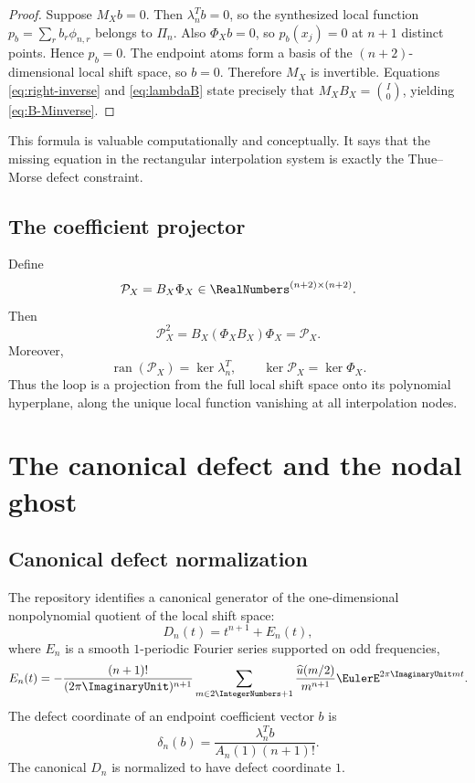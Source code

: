 \documentclass[11pt,oneside]{article}
\theoremstyle{definition}
\theoremstyle{remark}
\DeclareMathOperator{\range}{ran}
\newcommand{\1}{\mathbf{1}}
\begin{document}
\begin{proof}
Suppose $M_Xb=0$.  Then $\lambda_n^Tb=0$, so the synthesized local function
$p_b=\sum_rb_r\phi_{n,r}$ belongs to $\Pi_n$.  Also
$\Phi_Xb=0$, so $p_b(x_j)=0$ at $n+1$ distinct points.  Hence $p_b=0$.
The endpoint atoms form a basis of the $(n+2)$-dimensional local shift space,
so $b=0$.  Therefore $M_X$ is invertible.  Equations
\eqref{eq:right-inverse} and \eqref{eq:lambdaB} state precisely that
$M_XB_X=\binom{I}{0}$, yielding \eqref{eq:B-Minverse}.
\end{proof}

This formula is valuable computationally and conceptually.  It says that the
missing equation in the rectangular interpolation system is exactly the
Thue--Morse defect constraint.

\subsection{The coefficient projector}

Define
\begin{equation}
 \mathcal P_X=B_X\Phi_X\in\RealNumbers^{(n+2)\times(n+2)}.
 \label{eq:PX}
\end{equation}
Then
\[
 \mathcal P_X^2=B_X(\Phi_XB_X)\Phi_X=\mathcal P_X.
\]
Moreover,
\begin{equation}
 \range(\mathcal P_X)=\ker\lambda_n^T,
 \qquad
 \ker\mathcal P_X=\ker\Phi_X.
 \label{eq:projector-spaces}
\end{equation}
Thus the loop is a projection from the full local shift space onto its
polynomial hyperplane, along the unique local function vanishing at all
interpolation nodes.

\section{The canonical defect and the nodal ghost}
\label{sec:ghost}

\subsection{Canonical defect normalization}

The repository identifies a canonical generator of the one-dimensional
nonpolynomial quotient of the local shift space:
\begin{equation}
 D_n(t)=t^{n+1}+E_n(t),
 \label{eq:Dn}
\end{equation}
where $E_n$ is a smooth $1$-periodic Fourier series supported on odd
frequencies,
\begin{equation}
 E_n(t)=-\frac{(n+1)!}{(2\pi\ImaginaryUnit)^{n+1}}
 \sum_{m\in2\IntegerNumbers+1}\frac{\widehat u(m/2)}{m^{n+1}}
 \EulerE^{2\pi\ImaginaryUnit mt}.
 \label{eq:En}
\end{equation}
The defect coordinate of an endpoint coefficient vector $b$ is
\begin{equation}
 \delta_n(b)=\frac{\lambda_n^Tb}{A_n(1)(n+1)!}.
 \label{eq:defect-coordinate}
\end{equation}
The canonical $D_n$ is normalized to have defect coordinate $1$.
\end{document}
